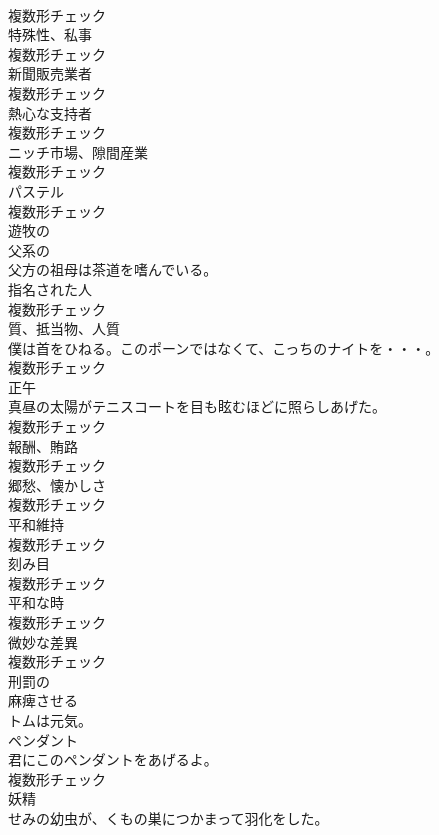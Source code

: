 \documentclass[8pt]{extreport}
\begin{document}
\begin{CJK}{UTF8}{min}
\\	複数形チェック
\\	[名詞]	特殊性、私事	
\\	複数形チェック
\\	[名詞]	新聞販売業者	
\\	複数形チェック
\\	[名詞]	熱心な支持者	
\\	複数形チェック
\\	[名詞]	ニッチ市場、隙間産業	
\\	複数形チェック
\\	[名詞]	パステル	
\\	複数形チェック
\\	[形容詞]	遊牧の	
\\	[形容詞]	父系の	
\\	父方の祖母は茶道を嗜んでいる。	
\\	[名詞]	指名された人	
\\	複数形チェック
\\	[名詞]	質、抵当物、人質	
\\	僕は首をひねる。このポーンではなくて、こっちのナイトを・・・。	
\\	複数形チェック
\\	[名詞]	正午	
\\	真昼の太陽がテニスコートを目も眩むほどに照らしあげた。	
\\	複数形チェック
\\	[名詞]	報酬、賄路	
\\	複数形チェック
\\	[名詞]	郷愁、懐かしさ	
\\	複数形チェック
\\	[名詞]	平和維持	
\\	複数形チェック
\\	[名詞]	刻み目	
\\	複数形チェック
\\	[名詞]	平和な時	
\\	複数形チェック
\\	[名詞]	微妙な差異	
\\	複数形チェック
\\	[形容詞]	刑罰の	
\\	[動詞]	麻痺させる	
\\	トムは元気。	
\\	[名詞]	ペンダント	
\\	君にこのペンダントをあげるよ。	
\\	複数形チェック
\\	[名詞]	妖精	
\\	せみの幼虫が、くもの巣につかまって羽化をした。	

\end{CJK}
\end{document}
